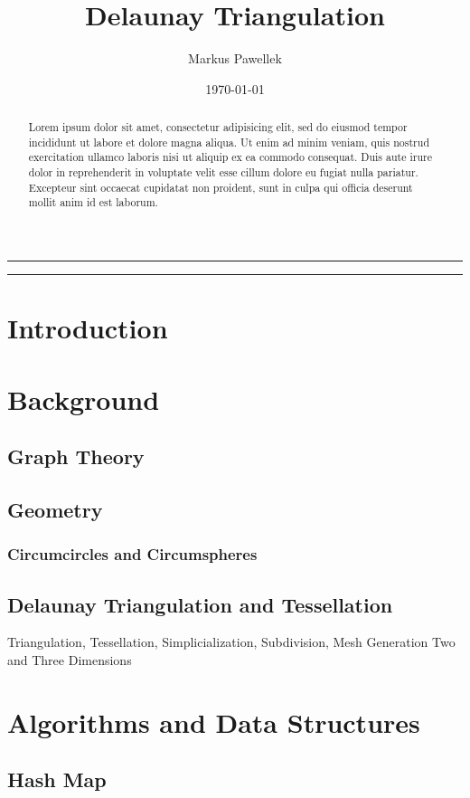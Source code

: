 \documentclass[10pt, twoside, fleqn]{article}
\title{Delaunay Triangulation}
\author{Markus Pawellek}
\date{\today}
\let\oldsection\section
\renewcommand*\section{%
  \cleardoublepage
  \thispagestyle{sectionstyle}\oldsection}
\let\oldpagenumbering\pagenumbering
\renewcommand*\pagenumbering[1]{%
  \cleardoublepage
  \oldpagenumbering{#1}}
\begin{document}
  \maketitle
  \thispagestyle{empty}

  \bigskip
  \hrule
  \medskip
  \begin{abstract}
    Lorem ipsum dolor sit amet, consectetur adipisicing elit, sed do eiusmod
    tempor incididunt ut labore et dolore magna aliqua. Ut enim ad minim veniam,
    quis nostrud exercitation ullamco laboris nisi ut aliquip ex ea commodo
    consequat. Duis aute irure dolor in reprehenderit in voluptate velit esse
    cillum dolore eu fugiat nulla pariatur. Excepteur sint occaecat cupidatat non
    proident, sunt in culpa qui officia deserunt mollit anim id est laborum.
  \end{abstract}
  \medskip
  \hrule
  \bigskip

  \tableofcontents

  \section{Introduction}
  \section{Background}
    \subsection{Graph Theory}
    \subsection{Geometry}
      \subsubsection{Circumcircles and Circumspheres}
    \subsection{Delaunay Triangulation and Tessellation}
      Triangulation, Tessellation, Simplicialization, Subdivision, Mesh Generation
      Two and Three Dimensions
  \section{Algorithms and Data Structures}
    \subsection{Hash Map}
\end{document}

